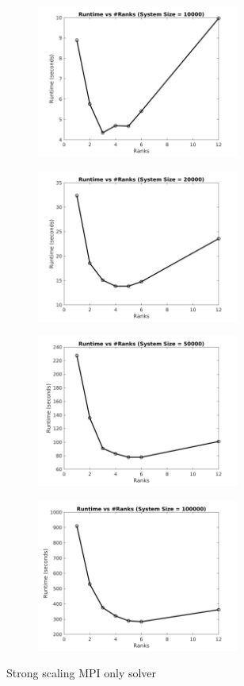 \documentclass[sigplan,screen]{acmart}
\begin{document}
\begin{figure}
\begin{subfigure}{0.4\textwidth}
		\caption{}
	\end{subfigure}
	\begin{subfigure}{0.4\textwidth}
		\includegraphics[trim= 20 5 35 10,clip, width=0.95\linewidth, height=5cm]{plots/MPI_strong_10k.png}
		\caption{}
	\end{subfigure}
	\begin{subfigure}{0.4\textwidth}
		\includegraphics[trim= 20 5 35 10,clip, width=0.95\linewidth, height=5cm]{plots/MPI_strong_20k.png} 
		\caption{}
	\end{subfigure}
	\begin{subfigure}{0.4\textwidth}
		\includegraphics[trim= 20 5 35 10,clip, width=0.95\linewidth, height=5cm]{plots/MPI_strong_50k.png}
		\caption{}
	\end{subfigure}
	\begin{subfigure}{0.4\textwidth}
		\includegraphics[trim= 20 5 35 10,clip, width=0.95\linewidth, height=5cm]{plots/MPI_strong_100k.png}
		\caption{}
	\end{subfigure}
	\caption{Strong scaling MPI only solver}
	\label{strong1}
\end{figure}
\end{document}
